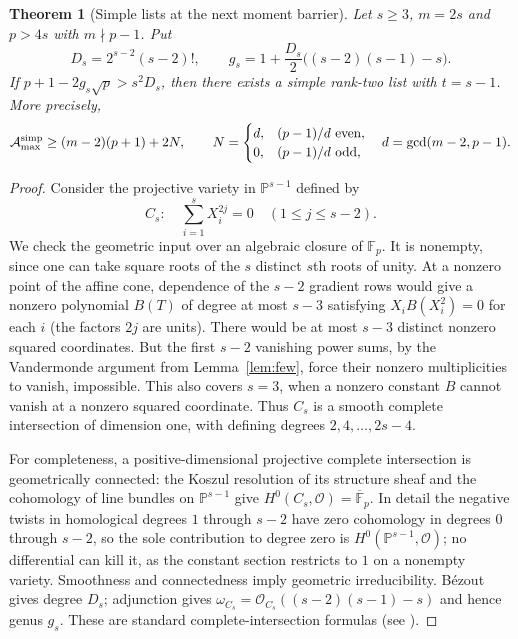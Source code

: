 \documentclass[11pt]{article}
\newtheorem{theorem}{Theorem}[section]
\theoremstyle{remark}\newtheorem{remark}[theorem]{Remark}
\newcommand{\F}{\mathbb F}
\newcommand{\Pj}{\mathbb P}
\newcommand{\A}{\mathcal A}
\begin{document}
\begin{theorem}[Simple lists at the next moment barrier]\label{thm:curve}
Let $s\ge3$, $m=2s$ and $p>4s$ with $m\nmid p-1$. Put
\[
 D_s=2^{s-2}(s-2)!,\qquad g_s=1+\frac{D_s}{2}\big((s-2)(s-1)-s\big).
\]
If $p+1-2g_s\sqrt p>s^2D_s$, then there exists a simple rank-two list with $t=s-1$. More precisely,
\begin{equation}\label{eq:lowerref}
 \A_{\max}^{\rm simp}\ge (m-2)(p+1)+2N,\qquad
 N=\begin{cases}d,&(p-1)/d\text{ even},\\0,&(p-1)/d\text{ odd},\end{cases}
 \quad d=\gcd(m-2,p-1).
\end{equation}
\end{theorem}
\begin{proof}
Consider the projective variety in $\Pj^{s-1}$ defined by
\begin{equation}\label{eq:curve}
 C_s:\quad \sum_{i=1}^s X_i^{2j}=0\quad(1\le j\le s-2).
\end{equation}
We check the geometric input over an algebraic closure of $\F_p$. It is nonempty, since one can take square roots of the $s$ distinct $s$th roots of unity. At a nonzero point of the affine cone, dependence of the $s-2$ gradient rows would give a nonzero polynomial $B(T)$ of degree at most $s-3$ satisfying $X_i B(X_i^2)=0$ for each $i$ (the factors $2j$ are units). There would be at most $s-3$ distinct nonzero squared coordinates. But the first $s-2$ vanishing power sums, by the Vandermonde argument from Lemma~\ref{lem:few}, force their nonzero multiplicities to vanish, impossible. This also covers $s=3$, when a nonzero constant $B$ cannot vanish at a nonzero squared coordinate. Thus $C_s$ is a smooth complete intersection of dimension one, with defining degrees $2,4,\ldots,2s-4$.

For completeness, a positive-dimensional projective complete intersection is geometrically connected: the Koszul resolution of its structure sheaf and the cohomology of line bundles on $\Pj^{s-1}$ give $H^0(C_s,\mathcal O)=\overline{\F}_p$. In detail the negative twists in homological degrees $1$ through $s-2$ have zero cohomology in degrees $0$ through $s-2$, so the sole contribution to degree zero is $H^0(\Pj^{s-1},\mathcal O)$; no differential can kill it, as the constant section restricts to $1$ on a nonempty variety. Smoothness and connectedness imply geometric irreducibility. B\'ezout gives degree $D_s$; adjunction gives $\omega_{C_s}=\mathcal O_{C_s}((s-2)(s-1)-s)$ and hence genus $g_s$. These are standard complete-intersection formulas (see \cite{hartshorne}).


\end{proof}
\end{document}
